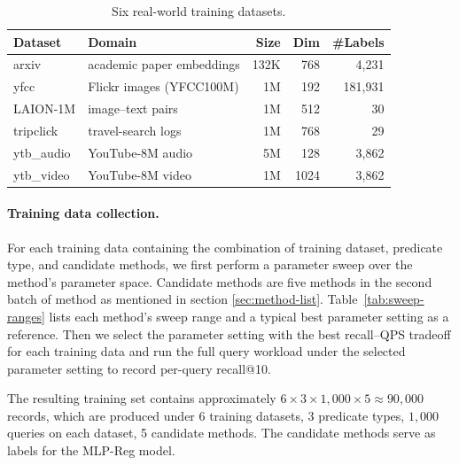 



\begin{table}[!htbp]
\centering
\caption{Six real-world training datasets.}
\label{tab:training-datasets}
\small
\setlength{\tabcolsep}{4pt}
\begin{tabular}{@{}llrrr@{}}
\toprule
Dataset & Domain & Size & Dim & \#Labels \\
\midrule
arxiv      & academic paper embeddings   & 132K & 768  & 4{,}231 \\
yfcc       & Flickr images (YFCC100M)    & 1M   & 192  & 181{,}931 \\
LAION-1M   & image--text pairs           & 1M   & 512  & 30 \\
tripclick  & travel-search logs          & 1M   & 768  & 29 \\
ytb\_audio & YouTube-8M audio            & 5M   & 128  & 3{,}862 \\
ytb\_video & YouTube-8M video            & 1M   & 1024 & 3{,}862 \\
\bottomrule
\end{tabular}
\end{table}

\paragraph{Training data collection.}
\label{ssec:training-data}
For each training data containing the combination of training dataset, predicate type, and candidate methods, we first perform a parameter sweep over the method's parameter space. Candidate methods are five methods in the second batch of method as mentioned in section \ref{sec:method-list}. Table~\ref{tab:sweep-ranges} lists each method's sweep range and a typical best parameter setting as a reference.
Then we select the parameter setting with the best recall--QPS tradeoff for each training data and run the full query workload under the selected parameter setting to record per-query recall@10. 

The resulting training set contains approximately $6 \times 3 \times 1{,}000 \times 5 \approx 90{,}000$ records, which are produced under 6 training datasets, 3 predicate types, $1{,}000$ queries on each dataset, 5 candidate methods. The candidate methods serve as labels for the MLP-Reg model.

